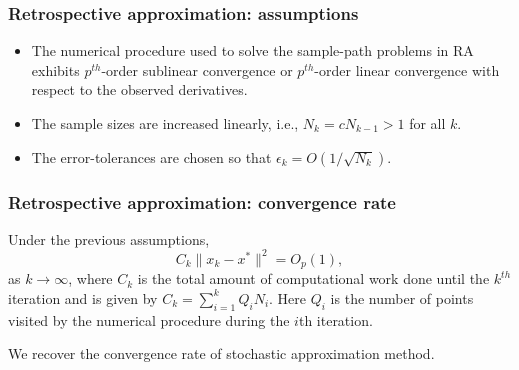 \documentclass[aspectratio=169]{beamer}
\begin{document}
\begin{frame}
\frametitle{Retrospective approximation: assumptions}

\begin{itemize}
\item
The numerical procedure used to solve the sample-path problems in RA exhibits $p^{th}$-order sublinear convergence or $p^{th}$-order linear convergence with respect to the observed derivatives.
\item
The sample sizes are increased linearly, i.e., $N_k = c N_{k - 1} > 1$ for all $k$.
\item
The error-tolerances are chosen so that
$\epsilon_k= O(1/\sqrt{N_k})$.
\end{itemize}

\end{frame}

\begin{frame}
\frametitle{Retrospective approximation: convergence rate}

Under the previous assumptions, %
$$
C_k \| x_k - x^* \|^2 = O_p(1),
$$
as $k \rightarrow \infty$, where $C_k$ is the total amount of computational work done until the $k^{th}$ iteration and is given by $C_k = \sum^k_{i = 1} Q_iN_i$.
Here $Q_i$ is the number of points visited by the numerical procedure during the $i$th iteration.

\mbox{}

We recover the convergence rate of stochastic approximation method.

\end{frame}



\end{document}
